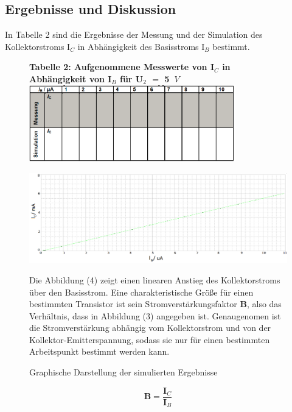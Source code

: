 \subsection{Ergebnisse und Diskussion}
In Tabelle 2 sind die Ergebnisse der Messung und der Simulation des Kollektorstroms I$_C$ in Abh\"angigkeit des Basisstroms I$_B$ bestimmt.
\begin{figure}[!h]
\begin{center}
\textbf{Tabelle 2: Aufgenommene Messwerte von I$_{C}$ in Abh\"angigkeit von I$_B$ f\"ur U$_2$ $=$ 5~$V$} \\[0.2cm]
\includegraphics[width=0.8\textwidth]{ergebnissVersuch2}
\end{center}
\end{figure}
\vspace{10cm}
\begin{figure}[!h]
\begin{center}
\includegraphics[width=1\textwidth]{Versuch2}
\caption{Graphische Darstellung der simulierten Ergebnisse}
\end{center}
Die Abbildung (4) zeigt einen linearen Anstieg des Kollektorstroms \"uber den Basisstrom. Eine charakteristische Gr\"o\ss e f\"ur einen bestimmten Transistor ist sein Stromverst\"arkungsfaktor \textbf{B}, also das Verh\"altnis, dass in Abbildung (3) angegeben ist. Genaugenomen ist die Stromverst\"arkung abh\"angig vom
Kollektorstrom und von der Kollektor-Emitterspannung, sodass sie nur f\"ur
einen bestimmten Arbeitspunkt bestimmt werden kann.
\end{figure}
\vspace{15cm}
\begin{equation}
\textbf{B} = \frac{\textbf{I$_C$}}{\textbf{I$_B$}}
\end{equation}
